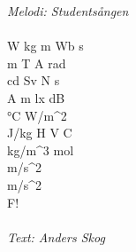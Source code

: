 {\footnotesize\textit{Melodi: Studentsången}}\\
\\
W kg m Wb s\\
\Omega m T A rad\\
cd Sv N s\\
\Omega  A m lx dB\\
°C W/m^{2}\\
J/kg H V C\\
kg/m^{3} mol\\
m/s^{2}\\
m/s^{2}\\
F!\\
\\
{\footnotesize\textit{Text: Anders Skog}}
